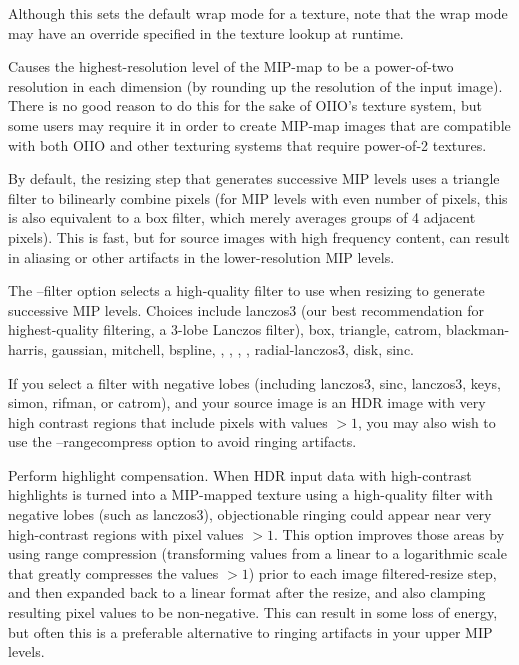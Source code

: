 Although this sets the default wrap mode for a texture, note that
the wrap mode may have an override specified in the texture lookup
at runtime.
\apiend

Causes the highest-resolution level of the MIP-map to be a
power-of-two resolution in each dimension
(by rounding up the resolution of the input image).  There is no
good reason to do this for the sake of OIIO's texture system, but 
some users may require it in order to create MIP-map images
that are compatible with both OIIO and other texturing systems that
require power-of-2 textures.
\apiend

By default, the resizing step that generates successive MIP levels
uses a triangle filter to bilinearly combine pixels (for MIP levels
with even number of pixels, this is also equivalent to a box filter,
which merely averages groups of 4 adjacent pixels).  This is fast,
but for source images with high frequency content, can result in 
aliasing or other artifacts in the lower-resolution MIP levels.

The {\cf --filter} option selects a high-quality filter to use when
resizing to generate successive MIP levels.  Choices include
{\cf lanczos3} (our best recommendation for highest-quality filtering, a
3-lobe Lanczos filter), {\cf box}, {\cf triangle}, {\cf catrom},
{\cf blackman-harris}, {\cf gaussian}, {\cf mitchell}, {\cf bspline},
, , ,
, {\cf radial-lanczos3}, {\cf disk}, {\cf sinc}.

If you select a filter with negative lobes (including
{\cf lanczos3}, {\cf sinc}, {\cf lanczos3}, {\cf keys}, {\cf simon},
{\cf rifman}, or {\cf catrom}), and your
source image is an HDR image with very high contrast regions that
include pixels with values $>1$, you may also wish to use the
{\cf --rangecompress} option to avoid ringing artifacts.
\apiend

Perform highlight compensation.  When HDR input data with high-contrast
highlights is turned into a MIP-mapped texture using a high-quality
filter with negative lobes (such as {\cf lanczos3}), objectionable
ringing could appear near very high-contrast regions with pixel values
$>1$. This option improves those areas by using range compression
(transforming values from a linear to a logarithmic scale that greatly
compresses the values $> 1$) prior to each
image filtered-resize step, and then expanded back to a linear format
after the resize, and also clamping resulting pixel values to be
non-negative.  This can result in some loss of energy, but often this is
a preferable alternative to ringing artifacts in your upper MIP levels.
\apiend

